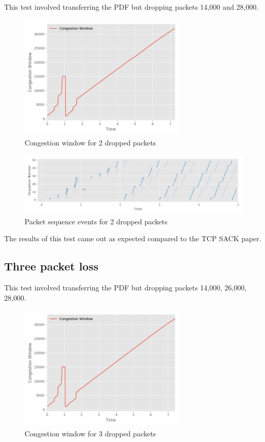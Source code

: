 \documentclass[fleqn,11pt]{article}
\begin{document}
\indent\indent This test involved transferring the PDF but dropping packets
14,000 and 28,000. 

\begin{figure}[!htb]
  \centering
  \includegraphics[width=8cm]{../graphs/2-cwnd.png}
  \caption{Congestion window for 2 dropped packets}
  \label{fig:throughput}
\end{figure}

\begin{figure}[!htb]
  \centering
  \includegraphics[width=13cm]{../graphs/2-sequence.png}
  \caption{Packet sequence events for 2 dropped packets}

  \label{fig:throughput}
\end{figure}

The results of this test came out as expected compared to the TCP SACK paper.

\newpage 
\subsection{Three packet loss}

\indent\indent This test involved transferring the PDF but dropping packets
14,000, 26,000, 28,000.

\begin{figure}[!htb]
  \centering
  \includegraphics[width=8cm]{../graphs/3-cwnd.png}
  \caption{Congestion window for 3 dropped packets}
  \label{fig:throughput}
\end{figure}
\end{document}
